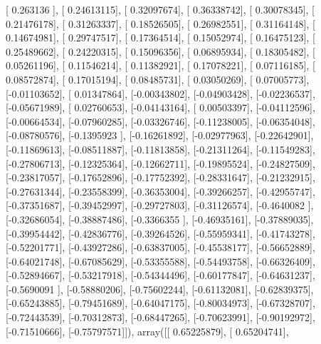 \documentclass{article}
\begin{document}
       [ 0.263136  ],
       [ 0.24613115],
       [ 0.32097674],
       [ 0.36338742],
       [ 0.30078345],
       [ 0.21476178],
       [ 0.31263337],
       [ 0.18526505],
       [ 0.26982551],
       [ 0.31164148],
       [ 0.14674981],
       [ 0.29747517],
       [ 0.17364514],
       [ 0.15052974],
       [ 0.16475123],
       [ 0.25489662],
       [ 0.24220315],
       [ 0.15096356],
       [ 0.06895934],
       [ 0.18305482],
       [ 0.05261196],
       [ 0.11546214],
       [ 0.11382921],
       [ 0.17078221],
       [ 0.07116185],
       [ 0.08572874],
       [ 0.17015194],
       [ 0.08485731],
       [ 0.03050269],
       [ 0.07005773],
       [-0.01103652],
       [ 0.01347864],
       [-0.00343802],
       [-0.04903428],
       [-0.02236537],
       [-0.05671989],
       [ 0.02760653],
       [-0.04143164],
       [ 0.00503397],
       [-0.04112596],
       [-0.00664534],
       [-0.07960285],
       [-0.03326746],
       [-0.11238005],
       [-0.06354048],
       [-0.08780576],
       [-0.1395923 ],
       [-0.16261892],
       [-0.02977963],
       [-0.22642901],
       [-0.11869613],
       [-0.08511887],
       [-0.11813858],
       [-0.21311264],
       [-0.11549283],
       [-0.27806713],
       [-0.12325364],
       [-0.12662711],
       [-0.19895524],
       [-0.24827509],
       [-0.23817057],
       [-0.17652896],
       [-0.17752392],
       [-0.28331647],
       [-0.21232915],
       [-0.27631344],
       [-0.23558399],
       [-0.36353004],
       [-0.39266257],
       [-0.42955747],
       [-0.37351687],
       [-0.39452997],
       [-0.29727803],
       [-0.31126574],
       [-0.4640082 ],
       [-0.32686054],
       [-0.38887486],
       [-0.3366355 ],
       [-0.46935161],
       [-0.37889035],
       [-0.39954442],
       [-0.42836776],
       [-0.39264526],
       [-0.55959341],
       [-0.41743278],
       [-0.52201771],
       [-0.43927286],
       [-0.63837005],
       [-0.45538177],
       [-0.56652889],
       [-0.64021748],
       [-0.67085629],
       [-0.53355588],
       [-0.54493758],
       [-0.66326409],
       [-0.52894667],
       [-0.53217918],
       [-0.54344496],
       [-0.60177847],
       [-0.64631237],
       [-0.5690091 ],
       [-0.58880206],
       [-0.75602244],
       [-0.61132081],
       [-0.62839375],
       [-0.65243885],
       [-0.79451689],
       [-0.64047175],
       [-0.80034973],
       [-0.67328707],
       [-0.72443539],
       [-0.70312873],
       [-0.68447265],
       [-0.70623991],
       [-0.90192972],
       [-0.71510666],
       [-0.75797571]]), array([[ 0.65225879],
       [ 0.65204741],
\end{document}

